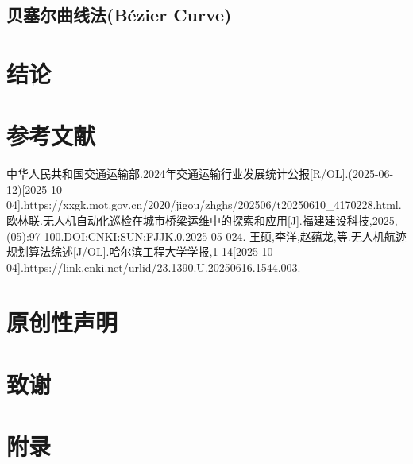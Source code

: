 \documentclass[12pt,a4paper,oneside,UTF8]{ctexart}
\begin{document}
\subsection{贝塞尔曲线法(Bézier Curve)}
\newpage\section{结论}
\newpage\section{参考文献}\begin{thebibliography}{20}
中华人民共和国交通运输部.2024年交通运输行业发展统计公报[R/OL].(2025-06-12)[2025-10-04].https://xxgk.mot.gov.cn/2020/jigou/zhghs/202506/t20250610\_4170228.html.
欧林联.无人机自动化巡检在城市桥梁运维中的探索和应用[J].福建建设科技,2025,(05):97-100.DOI:CNKI:SUN:FJJK.0.2025-05-024.
王硕,李洋,赵蕴龙,等.无人机航迹规划算法综述[J/OL].哈尔滨工程大学学报,1-14[2025-10-04].https://link.cnki.net/urlid/23.1390.U.20250616.1544.003.
\end{thebibliography}
\newpage\section{原创性声明}
\newpage\section{致谢}
\newpage\section{附录}
\end{document}
